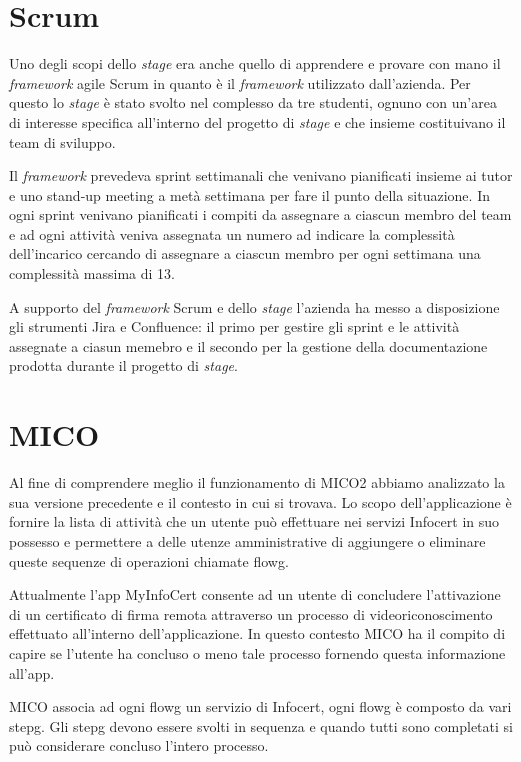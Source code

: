\section{Scrum}
Uno degli scopi dello \textit{stage} era anche quello di apprendere e provare con mano il \textit{framework} agile Scrum in quanto è il \textit{framework} utilizzato dall'azienda.
Per questo lo \textit{stage} è stato svolto nel complesso da tre studenti, ognuno con un'area di interesse specifica all'interno del progetto di \textit{stage} e che insieme costituivano il team di sviluppo.

Il \textit{framework} prevedeva sprint settimanali che venivano pianificati insieme ai tutor e uno stand-up meeting a metà settimana per fare il punto della situazione.
In ogni sprint venivano pianificati i compiti da assegnare a ciascun membro del team e ad ogni attività veniva assegnata un numero ad indicare la complessità dell'incarico cercando di assegnare a ciascun membro per ogni settimana una complessità massima di 13.

A supporto del \textit{framework} Scrum e dello \textit{stage} l'azienda ha messo a disposizione gli strumenti Jira e Confluence: il primo per gestire gli sprint e le attività assegnate a ciasun memebro e il secondo per la gestione della documentazione prodotta durante il progetto di \textit{stage}.

\section{MICO}
Al fine di comprendere meglio il funzionamento di MICO2 abbiamo analizzato la sua versione precedente e il contesto in cui si trovava.
Lo scopo dell'applicazione è fornire la lista di attività che un utente può effettuare nei servizi Infocert in suo possesso e permettere a delle utenze amministrative di aggiungere o eliminare queste sequenze di operazioni chiamate \gls{flowg}.

Attualmente l'app MyInfoCert consente ad un utente di concludere l'attivazione di un certificato di firma remota attraverso un processo di videoriconoscimento effettuato all'interno dell'applicazione. 
In questo contesto MICO ha il compito di capire se l'utente ha concluso o meno tale processo fornendo questa informazione all'app.

MICO associa ad ogni \gls{flowg} un servizio di Infocert, ogni \gls{flowg} è composto da vari \gls{stepg}.
Gli \gls{stepg} devono essere svolti in sequenza e quando tutti sono completati si può considerare concluso l'intero processo.

